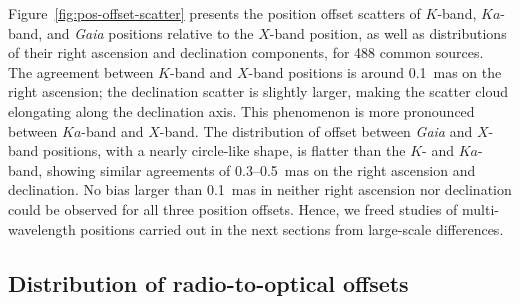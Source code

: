 \documentclass[referee]{aa}        %
\begin{document}
   Figure~\ref{fig:pos-offset-scatter} presents the position offset scatters of $K$-band, $Ka$-band, and \textit{Gaia} positions relative to the $X$-band position, as well as distributions of their right ascension and declination components, for 488 common sources.
   The agreement between $K$-band and $X$-band positions is around 0.1~mas on the right ascension;
   the declination scatter is slightly larger, making the scatter cloud elongating along the declination axis.
   This phenomenon is more pronounced between $Ka$-band and $X$-band.
   The distribution of offset between \textit{Gaia} and $X$-band positions, with a nearly circle-like shape, is flatter than the $K$- and $Ka$-band, showing similar agreements of 0.3--0.5~mas on the right ascension and declination.
   No bias larger than 0.1~mas in neither right ascension nor declination could be observed for all three position offsets.
   Hence, we freed studies of multi-wavelength positions carried out in the next sections from large-scale differences. %
%

\subsection{Distribution of radio-to-optical offsets}    \label{subsec:r2o-dist}
\end{document}
